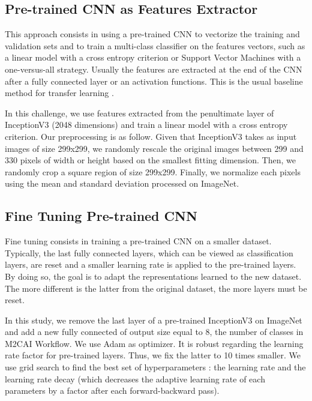 \documentclass[10pt,twocolumn,letterpaper]{article}
\begin{document}
\subsection{Pre-trained CNN as Features Extractor}

This approach consists in using a pre-trained CNN to vectorize the training and validation sets and to train a multi-class classifier on the features vectors, such as a linear model with a cross entropy criterion or Support Vector Machines with a one-versus-all strategy.
Usually the features are extracted at the end of the CNN after a fully connected layer or an activation functions. This is the usual baseline method for transfer learning \cite{simonyan2014very}.

In this challenge, we use features extracted from the penultimate layer of InceptionV3 \cite{szegedy2015rethinking} (2048 dimensions) and train a linear model with a cross entropy criterion. Our preprocessing is as follow. Given that InceptionV3 takes as input images of size 299x299, we randomly rescale the original images between 299 and 330 pixels of width or height based on the smallest fitting dimension. Then, we randomly crop a square region of size 299x299. Finally, we normalize each pixels using the mean and standard deviation processed on ImageNet.


\subsection{Fine Tuning Pre-trained CNN}

Fine tuning consists in training a pre-trained CNN on a smaller dataset. Typically, the last fully connected layers, which can be viewed as classification layers, are reset and a smaller learning rate is applied to the pre-trained layers. By doing so, the goal is to adapt the representations learned to the new dataset. The more different is the latter from the original dataset, the more layers must be reset.

In this study, we remove the last layer of a pre-trained InceptionV3 on ImageNet and add a new fully connected of output size equal to 8, the number of classes in M2CAI Workflow. We use Adam \cite{Kingma14} as optimizer. It is robust regarding the learning rate factor for pre-trained layers. Thus, we fix the latter to 10 times smaller. We use grid search to find the best set of hyperparameters : the learning rate and the learning rate decay (which decreases the adaptive learning rate of each parameters by a factor after each forward-backward pass).
\end{document}
